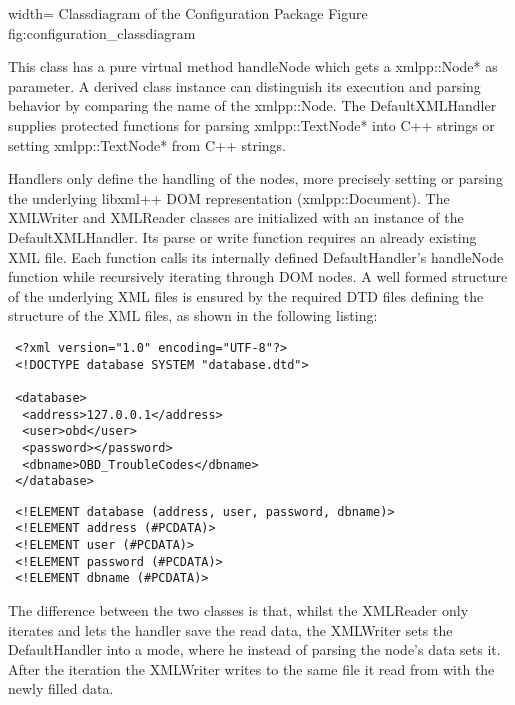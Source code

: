  {width=\textwidth}%
 {Classdiagram of the Configuration Package}%
 {Figure}%
 {fig:configuration_classdiagram}%

This class has a pure virtual method handleNode which gets a xmlpp::Node* as parameter. A derived class instance can distinguish its execution 
and parsing behavior by comparing the name of the xmlpp::Node. The DefaultXMLHandler supplies protected functions for parsing 
xmlpp::TextNode* into C++ strings or setting xmlpp::TextNode* from C++ strings. 

Handlers only define the handling of the nodes, more precisely setting or parsing the underlying libxml++ DOM representation (xmlpp::Document). 
The XMLWriter and XMLReader classes are initialized with an instance of the DefaultXMLHandler. Its parse or write function requires an already 
existing XML file. Each function calls its internally defined DefaultHandler’s handleNode function while recursively iterating through DOM nodes. 
A well formed structure of the underlying XML files is ensured by the required DTD files defining the structure of the XML files, as shown in the following listing:

\begin{verbatim}
 <?xml version="1.0" encoding="UTF-8"?>
 <!DOCTYPE database SYSTEM "database.dtd">

 <database>
  <address>127.0.0.1</address>
  <user>obd</user>
  <password></password>
  <dbname>OBD_TroubleCodes</dbname>
 </database>
\end{verbatim}

\begin{verbatim}
 <!ELEMENT database (address, user, password, dbname)>
 <!ELEMENT address (#PCDATA)>
 <!ELEMENT user (#PCDATA)>
 <!ELEMENT password (#PCDATA)>
 <!ELEMENT dbname (#PCDATA)>
\end{verbatim}

The difference between the two classes is that, whilst the XMLReader only iterates and lets the handler save the read data, the XMLWriter sets 
the DefaultHandler into a mode, where he instead of parsing the node’s data sets it. After the iteration the XMLWriter writes to the same file 
it read from with the newly filled data.



